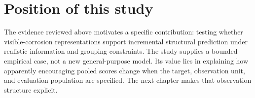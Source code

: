 \section{Position of this study}
The evidence reviewed above motivates a specific contribution: testing whether visible-corrosion representations support incremental structural prediction under realistic information and grouping constraints. The study supplies a bounded empirical case, not a new general-purpose model. Its value lies in explaining how apparently encouraging pooled scores change when the target, observation unit, and evaluation population are specified. The next chapter makes that observation structure explicit.
